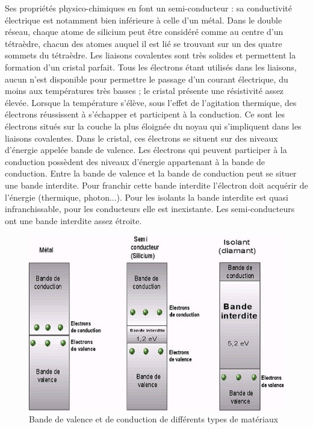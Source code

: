 Ses propriétés physico-chimiques en font un semi-conducteur : sa conductivité électrique est notamment bien inférieure à celle d'un métal. Dans le double réseau, chaque atome de silicium peut être considéré comme au centre d'un tétraèdre, chacun des atomes auquel il est lié se trouvant sur un des quatre sommets du tétraèdre. Les liaisons covalentes sont très solides et permettent la formation d'un cristal parfait. Tous les électrons étant utilisés dans les liaisons, aucun n'est disponible pour permettre le passage d'un courant électrique, du moins aux températures très basses ; le cristal présente une résistivité assez élevée. Lorsque la température s'élève, sous l'effet de l'agitation thermique, des électrons réussissent à s'échapper et participent à la conduction. Ce sont les électrons situés sur la couche la plus éloignée du noyau qui s'impliquent dans les liaisons covalentes. Dans le cristal, ces électrons se situent sur des niveaux d'énergie appelée bande de valence. Les électrons qui peuvent participer à la conduction possèdent des niveaux d'énergie appartenant à la bande de conduction. Entre la bande de valence et la bande de conduction peut se situer une bande interdite. Pour franchir cette bande interdite l'électron doit acquérir de l'énergie (thermique, photon...). Pour les isolants la bande interdite est quasi infranchissable, pour les conducteurs elle est inexistante. Les semi-conducteurs ont une bande interdite assez étroite.\\

\begin{figure}[htb]
\begin{center}
\includegraphics[scale=1.3]{figures/bande-interdite-valence-et-conduction-copie.png}
\caption{Bande de valence et de conduction de différents types de matériaux}
\end{center}
\end{figure}

